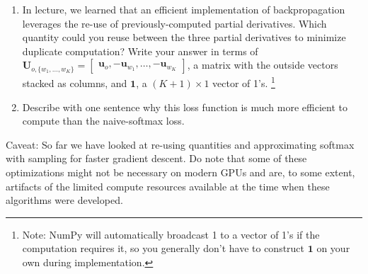 \documentclass{article}
\begin{document}
\begin{enumerate}[label=(\alph*)]
\begin{enumerate}[label=(\roman*)]
\item In lecture, we learned that an efficient implementation of backpropagation leverages the re-use of previously-computed partial derivatives. Which quantity could you reuse between the three partial derivatives to minimize duplicate computation? Write your answer in terms of \\ $\bm{U}_{o, \{w_1, \dots, w_K\}} = \begin{bmatrix} \bm{u}_o, -\bm{u}_{w_1}, \dots, -\bm{u}_{w_K} \end{bmatrix}$, a matrix with the outside vectors stacked as columns, and $\bm{1}$, a $(K + 1) \times 1$ vector of 1's. \footnote{Note: NumPy will automatically broadcast 1 to a vector of 1's if the computation requires it, so you generally don't have to construct $\bm{1}$ on your own during implementation.}

\item Describe with one sentence why this loss function is much more efficient to compute than the naive-softmax loss.
\end{enumerate}

Caveat: So far we have looked at re-using quantities and approximating softmax with sampling for faster gradient descent. Do note that some of these optimizations might not be necessary on modern GPUs and are, to some extent, artifacts of the limited compute resources available at the time when these algorithms were developed.


\end{enumerate}
\end{document}
